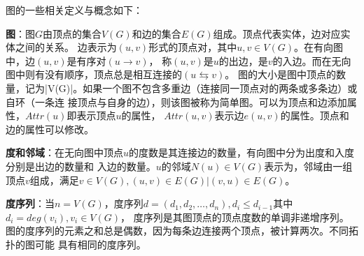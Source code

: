 \documentclass[master]{thesis-uestc}
\begin{document}
    图的一些相关定义与概念如下：

    \textbf{图}：图$G$由顶点的集合$V(G)$和边的集合$E(G)$组成。顶点代表实体，边对应实体之间的关系。
边表示为$(u,v)$形式的顶点对，其中$u,v \in V(G)$。在有向图中，边$(u,v)$是有序对$(u \rightarrow v)$，
称$(u,v)$是$u$的出边，是$v$的入边。而在无向图中则有没有顺序，顶点总是相互连接的$(u \leftrightarrows v)$。
图的大小是图中顶点的数量，记为|V(G)|。如果一个图不包含多重边（连接同一顶点对的两条或多条边）或自环（一条连
接顶点与自身的边），则该图被称为简单图。可以为顶点和边添加属性，$Attr(u)$即表示顶点$u$的属性，
$Attr(u,v)$表示边$e(u,v)$的属性。顶点和边的属性可以修改。

    \textbf{度和邻域}：在无向图中顶点$u$的度数是其连接边的数量，有向图中分为出度和入度分别是出边的数量和
入边的数量。$u$的邻域$N(u) \in V(G)$表示为，邻域由一组顶点$v$组成，满足$v \in V(G), (u,v)\in E(G) | (v,u) \in E(G)$。

    \textbf{度序列}：当$n=V(G)$，度序列$d=(d_1,d_2,\ldots,d_n), d_i \le d_{i-1}$其中$d_i=deg(v_i), v_i \in V(G)$，
度序列是其图顶点的顶点度数的单调非递增序列。图的度序列的元素之和总是偶数，因为每条边连接两个顶点，被计算两次。不同拓扑的图可能
具有相同的度序列。
\end{document}
